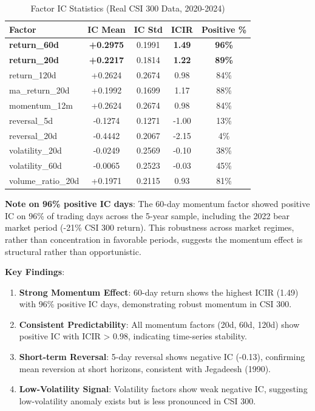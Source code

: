 \begin{table}[h]
\centering
\caption{Factor IC Statistics (Real CSI 300 Data, 2020-2024)}
\label{tab:ic}
\begin{tabular}{lcccc}
\toprule
Factor & IC Mean & IC Std & ICIR & Positive \% \\
\midrule
\textbf{return\_60d} & \textbf{+0.2975} & 0.1991 & \textbf{1.49} & \textbf{96\%} \\
\textbf{return\_20d} & \textbf{+0.2217} & 0.1814 & \textbf{1.22} & \textbf{89\%} \\
return\_120d & +0.2624 & 0.2674 & 0.98 & 84\% \\
ma\_return\_20d & +0.1992 & 0.1699 & 1.17 & 88\% \\
momentum\_12m & +0.2624 & 0.2674 & 0.98 & 84\% \\
\midrule
reversal\_5d & -0.1274 & 0.1271 & -1.00 & 13\% \\
reversal\_20d & -0.4442 & 0.2067 & -2.15 & 4\% \\
\midrule
volatility\_20d & -0.0249 & 0.2569 & -0.10 & 38\% \\
volatility\_60d & -0.0065 & 0.2523 & -0.03 & 45\% \\
\midrule
volume\_ratio\_20d & +0.1971 & 0.2115 & 0.93 & 81\% \\
\bottomrule
\end{tabular}
\begin{tablenotes}
\footnotesize
\item \textbf{Note on 96\% positive IC days}: The 60-day momentum factor showed positive IC on 96\% of trading days across the 5-year sample, including the 2022 bear market period (-21\% CSI 300 return). This robustness across market regimes, rather than concentration in favorable periods, suggests the momentum effect is structural rather than opportunistic.
\end{tablenotes}
\end{table}

\textbf{Key Findings}:

\begin{enumerate}
    \item \textbf{Strong Momentum Effect}: 60-day return shows the highest ICIR (1.49) with 96\% positive IC days, demonstrating robust momentum in CSI 300.

    \item \textbf{Consistent Predictability}: All momentum factors (20d, 60d, 120d) show positive IC with ICIR > 0.98, indicating time-series stability.

    \item \textbf{Short-term Reversal}: 5-day reversal shows negative IC (-0.13), confirming mean reversion at short horizons, consistent with Jegadeesh (1990).

    \item \textbf{Low-Volatility Signal}: Volatility factors show weak negative IC, suggesting low-volatility anomaly exists but is less pronounced in CSI 300.
\end{enumerate}

